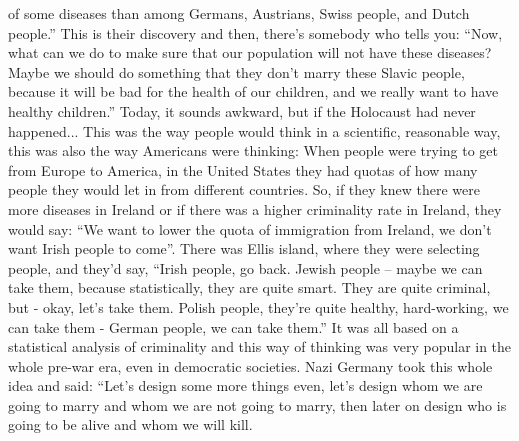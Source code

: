 of some diseases than among Germans, Austrians, Swiss people, and Dutch people.'' This is their discovery and then, there’s somebody who tells you: ``Now, what can we do to make sure that our population will not have these diseases? Maybe we should do something that they don’t marry these Slavic people, because it will be bad for the health of our children, and we really want to have healthy children.'' Today, it sounds awkward, but if the Holocaust had never happened... This was the way people would think in a scientific, reasonable way, this was also the way Americans were thinking: When people were trying to get from Europe to America, in the United States they had quotas of how many people they would let in from different countries. So, if they knew there were more diseases in Ireland or if there was a higher criminality rate in Ireland, they would say: ``We want to lower the quota of immigration from Ireland, we don’t want Irish people to come''. There was Ellis island, where they were selecting people, and they’d say, ``Irish people, go back. Jewish people – maybe we can take them, because statistically, they are quite smart. They are quite criminal, but - okay, let’s take them. Polish people, they’re quite healthy, hard-working, we can take them - German people, we can take them.'' It was all based on a statistical analysis of criminality and this way of thinking was very popular in the whole pre-war era, even in democratic societies. Nazi Germany took this whole idea and said: ``Let’s design some more things even, let’s design whom we are going to marry and whom we are not going to marry, then later on design who is going to be alive and whom we will kill.\\
